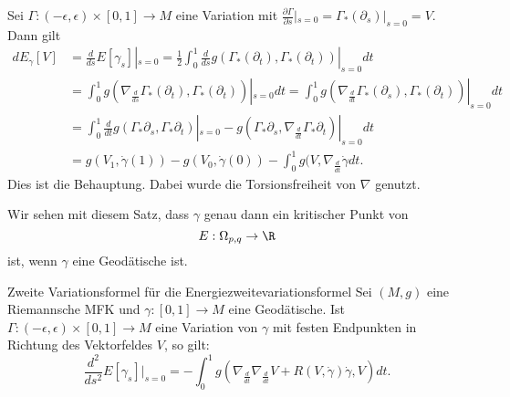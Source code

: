 \begin{beweis}
Sei $\Gamma: (-\epsilon, \epsilon) \times [0,1] \to M$ eine Variation mit $\frac{\partial \Gamma}{\partial s}|_{s=0} = \Gamma_\ast(\partial_s)|_{s=0} = V$. Dann gilt
\begin{align}
dE_\gamma [V] &= \frac{d}{ds} E[\gamma_s]|_{s=0} = \frac{1}{2} \int_0^1 \frac{d}{ds} g(\Gamma_\ast (\partial_t), \Gamma_\ast(\partial_t))|_{s=0} dt\\
&= \int_0^1 g(\nabla_\frac{d}{ds} \Gamma_\ast(\partial_t), \Gamma_\ast(\partial_t))|_{s=0} dt = \int_0^1 g(\nabla_\frac{d}{dt} \Gamma_\ast (\partial_s), \Gamma_\ast(\partial_t))|_{s=0} dt\\
&= \int_0^1 \frac{d}{dt} g(\Gamma_\ast \partial_s, \Gamma_\ast \partial_t)|_{s=0} - g(\Gamma_\ast \partial_s, \nabla_\frac{d}{dt} \Gamma_\ast \partial_t)|_{s=0} dt\\
&= g(V_1, \dot{\gamma}(1) )- g(V_0, \dot{\gamma}(0)) - \int_0^1 g(V, \nabla_\frac{d}{dt} \dot{\gamma} dt.
\end{align}
Dies ist die Behauptung. Dabei wurde die Torsionsfreiheit von $\nabla$ genutzt.
\end{beweis}
Wir sehen mit diesem Satz, dass $\gamma$ genau dann ein kritischer Punkt von
\begin{equation}
E: \Omega_{p,q} \to \R
\end{equation}
ist, wenn $\gamma$ eine Geodätische ist.
\begin{satz}{Zweite Variationsformel für die Energie}{zweitevariationsformel}
Sei $(M,g)$ eine Riemannsche MFK und $\gamma: [0,1] \to M$ eine Geodätische. Ist $\Gamma: (-\epsilon, \epsilon) \times [0,1] \to M$ eine Variation von $\gamma$ mit festen Endpunkten in Richtung des Vektorfeldes $V$, so gilt:
\begin{equation}
\frac{d^2}{ds^2} E[\gamma_s]|_{s=0} = - \int_0^1 g(\nabla_\frac{d}{dt} \nabla_\frac{d}{dt} V + R(V, \dot{\gamma})\dot{\gamma}, V) dt.
\end{equation}
\end{satz}
